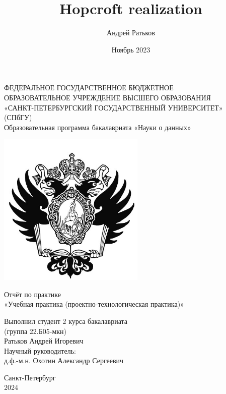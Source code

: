 \documentclass{article}
\title{Hopcroft realization}
\author{Андрей Ратьков}
\date{Ноябрь 2023}
\begin{document}
\begin{center}
  \hfill \break
  \footnotesize{ФЕДЕРАЛЬНОЕ ГОСУДАРСТВЕННОЕ БЮДЖЕТНОЕ}\\ 
  \footnotesize{ОБРАЗОВАТЕЛЬНОЕ УЧРЕЖДЕНИЕ ВЫСШЕГО ОБРАЗОВАНИЯ}\\
  \footnotesize{«САНКТ-ПЕТЕРБУРГСКИЙ ГОСУДАРСТВЕННЫЙ УНИВЕРСИТЕТ»}\\
  \footnotesize{(СПбГУ)}\\
  \hfill \break
  \normalsize{Образовательная программа бакалавриата «Науки о данных»}\\
  \hfill \break
  \hfill \break
  \begin{center}
    \includegraphics[width=7cm]{eagle.png}
  \end{center}
  \large{Отчёт по практике}\\
  \large{«Учебная практика (проектно-технологическая практика)»}\\
  \hfill\break
  \hfill \break
  \hfill \break
  \hfill \break
  \hfill \break
\end{center}
\begin{flushright}
  Выполнил студент 2 курса бакалавриата\\
  (группа 22.Б05-мкн)\\
  Ратьков Андрей Игоревич\\
  \hfill \break
  \hfill \break
  Научный руководитель:\\
  д.ф.-м.н. Охотин Александр Сергеевич\\
  \hfill \break
  \hfill \break
  \hfill \break
  \hfill \break
\end{flushright}
\begin{center}
  \hfill \break
  \hfill \break
  \hfill \break
  \hfill \break
  \hfill \break
  Санкт-Петербург\\
  2024
\end{center}
\clearpage
\tableofcontents \newpage
\end{document}
